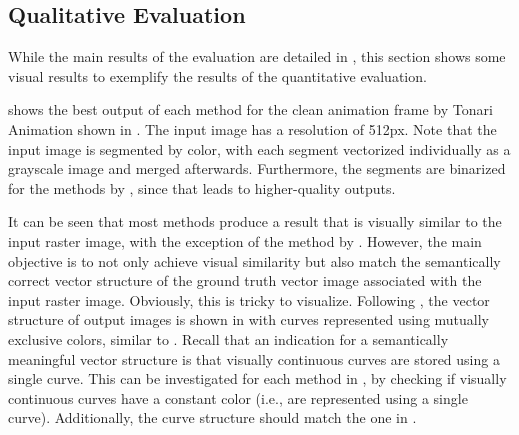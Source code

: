 \clearpage
\subsection{Qualitative Evaluation}
\label{subsec:eval.qual}

While the main results of the evaluation are detailed in , this section shows some visual results to exemplify the results of the quantitative evaluation.

 shows the best output of each method for the clean animation frame by Tonari Animation shown in . The input image has a resolution of 512px. Note that the input image is segmented by color, with each segment vectorized individually as a grayscale image and merged afterwards. Furthermore, the segments are binarized for the methods by \citet{autotrace,Puhachov2021KeypointPolyvector,mo2021virtualsketching}, since that leads to higher-quality outputs.

It can be seen that most methods produce a result that is visually similar to the input raster image, with the exception of the method by \citet{DBLP:conf/eccv/EgiazarianVAVST20}. However, the main objective is to not only achieve visual similarity but also match the semantically correct vector structure of the ground truth vector image associated with the input raster image. Obviously, this is tricky to visualize. Following \citet{DBLP:journals/cgf/GuoZHHLW19,mo2021virtualsketching,Puhachov2021KeypointPolyvector}, the vector structure of output images is shown in  with curves represented using mutually exclusive colors, similar to . Recall that an indication for a semantically meaningful vector structure is that visually continuous curves are stored using a single curve. This can be investigated for each method in , by checking if visually continuous curves have a constant color (i.e., are represented using a single curve). Additionally, the curve structure should match the one in .


